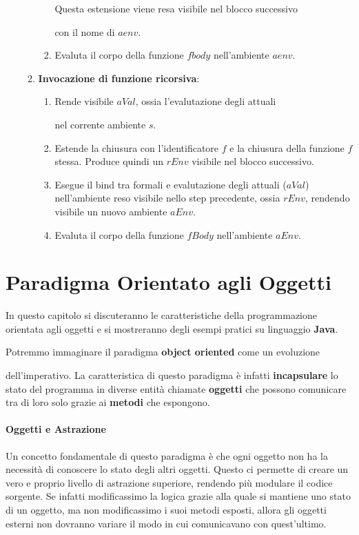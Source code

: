 \documentclass{article}
\begin{document}
\begin{enumerate}
\begin{enumerate}
\begin{enumerate}
            Questa estensione viene resa visibile nel blocco successivo 
            
            con il nome di $aenv$.
            \item Evaluta il corpo della funzione $fbody$ nell'ambiente $aenv$.
        \end{enumerate}

    \item \textbf{Invocazione di funzione ricorsiva}:
    \begin{enumerate}
        \item Rende visibile $aVal$, ossia l'evalutazione degli attuali 
            
        nel corrente ambiente $s$.
        \item Estende la chiusura con l'identificatore $f$ e la chiusura della funzione $f$ stessa. Produce quindi un $rEnv$ visibile nel blocco successivo.
        \item Esegue il bind tra formali e evalutazione degli attuali ($aVal$) nell'ambiente reso visibile nello step precedente, ossia $rEnv$, rendendo visibile un nuovo ambiente $aEnv$.
        \item Evaluta il corpo della funzione $fBody$ nell'ambiente $aEnv$.
    \end{enumerate}
        
    \end{enumerate}
    
\end{enumerate}

\newpage

\section{Paradigma Orientato agli Oggetti}

In questo capitolo si discuteranno le caratteristiche della programmazione orientata agli oggetti e si mostreranno degli esempi pratici su linguaggio \textbf{Java}.

Potremmo immaginare il paradigma \textbf{object oriented} come un evoluzione 

dell'imperativo. La caratteristica di questo paradigma è infatti \textbf{incapsulare} lo stato del programma in diverse entità chiamate \textbf{oggetti} che possono comunicare tra di loro solo grazie ai \textbf{metodi} che espongono.

\vspace*{15px}

\paragraph{Oggetti e Astrazione} Un concetto fondamentale di questo paradigma è che ogni oggetto non ha la necessità di conoscere lo stato degli altri oggetti. Questo ci permette di creare un vero e proprio livello di astrazione superiore, rendendo più modulare il codice sorgente. Se infatti modificassimo la logica grazie alla quale si mantiene uno stato di un oggetto, ma non modificassimo i suoi metodi esposti, allora gli oggetti esterni non dovranno variare il modo in cui comunicavano con quest'ultimo.
\end{document}
